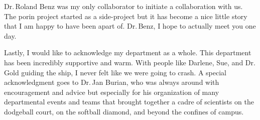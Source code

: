 Dr.\,Roland Benz was my only collaborator to initiate a collaboration with us. The porin project started as a side-project but it has become a nice little story that I am happy to have been apart of. Dr.\,Benz, I hope to actually meet you one day.

Lastly, I would like to acknowledge my department as a whole. This department has been incredibly supportive and warm. With people like Darlene, Sue, and Dr.\,Gold guiding the ship, I never felt like we were going to crash. A special acknowledgment goes to Dr.\,Jan Burian, who was always around with encouragement and advice but especially for his organization of many departmental events and teams that brought together a cadre of scientists on the dodgeball court, on the softball diamond, and beyond the confines of campus.


